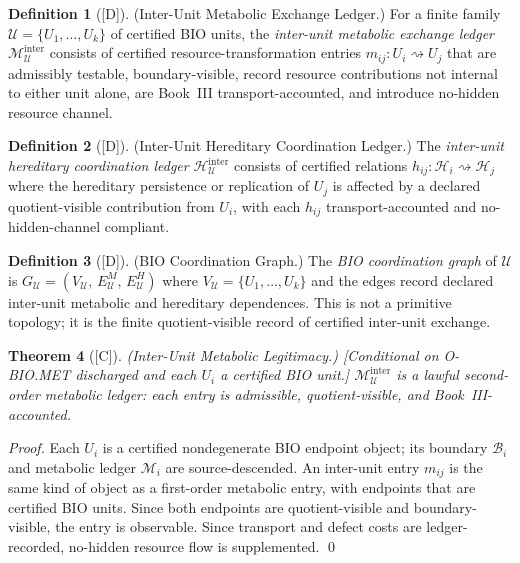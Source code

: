 \documentclass[12pt,oneside]{amsbook}
\theoremstyle{plain}
\newtheorem{theorem}{Theorem}[section]
\theoremstyle{definition}
\newtheorem{definition}[theorem]{Definition}
\theoremstyle{remark}
\newcommand{\status}[1]{\textup{[#1]}}
\begin{document}
\begin{definition}[\status{D}]\label{def:bio-inter-metabolic-ledger}
\textup{(Inter-Unit Metabolic Exchange Ledger.)}
For a finite family $\mathcal{U} = \{U_1,\ldots,U_k\}$ of certified
BIO units, the \emph{inter-unit metabolic exchange ledger}
$\mathcal{M}_{\mathcal{U}}^{\mathrm{inter}}$ consists of certified
resource-transformation entries $m_{ij} : U_i \rightsquigarrow U_j$
that are admissibly testable, boundary-visible, record resource
contributions not internal to either unit alone, are Book~III
transport-accounted, and introduce no-hidden resource channel.
\end{definition}

\begin{definition}[\status{D}]\label{def:bio-inter-hereditary-ledger}
\textup{(Inter-Unit Hereditary Coordination Ledger.)}
The \emph{inter-unit hereditary coordination ledger}
$\mathcal{H}_{\mathcal{U}}^{\mathrm{inter}}$ consists of certified
relations $h_{ij} : \mathcal{H}_i \rightsquigarrow \mathcal{H}_j$
where the hereditary persistence or replication of $U_j$ is affected
by a declared quotient-visible contribution from $U_i$, with each
$h_{ij}$ transport-accounted and no-hidden-channel compliant.
\end{definition}

\begin{definition}[\status{D}]\label{def:bio-coordination-graph}
\textup{(BIO Coordination Graph.)}
The \emph{BIO coordination graph} of $\mathcal{U}$ is
$G_{\mathcal{U}} = (V_{\mathcal{U}},\, E^M_{\mathcal{U}},\, E^H_{\mathcal{U}})$
where $V_{\mathcal{U}} = \{U_1,\ldots,U_k\}$ and the edges record
declared inter-unit metabolic and hereditary dependences.
This is not a primitive topology; it is the finite quotient-visible
record of certified inter-unit exchange.
\end{definition}

\begin{theorem}[\status{C}]\label{thm:bio-inter-metabolic-legitimacy}
\textup{(Inter-Unit Metabolic Legitimacy.)}
\textup{[Conditional on O-BIO.MET discharged and each $U_i$ a
certified BIO unit.]}
$\mathcal{M}_{\mathcal{U}}^{\mathrm{inter}}$ is a lawful second-order
metabolic ledger: each entry is admissible, quotient-visible, and
Book~III-accounted.
\end{theorem}

\begin{proof}
Each $U_i$ is a certified nondegenerate BIO endpoint object; its
boundary $\mathcal{B}_i$ and metabolic ledger $\mathcal{M}_i$ are
source-descended. An inter-unit entry $m_{ij}$ is the same kind of
object as a first-order metabolic entry, with endpoints that are
certified BIO units. Since both endpoints are quotient-visible and
boundary-visible, the entry is observable. Since transport and defect
costs are ledger-recorded, no-hidden resource flow is supplemented.
\qed
\end{proof}
\end{document}

